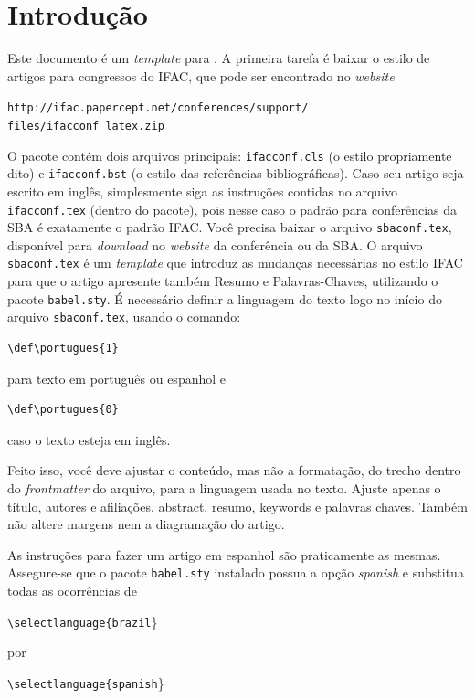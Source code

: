 \section{Introdução}


Este documento é um {\em template} para \LaTeXe. A primeira tarefa é baixar o estilo de artigos para congressos do IFAC, que pode ser encontrado no {\em website}

{\tt http://ifac.papercept.net/conferences/support/}\\
{\tt	files/ifacconf\_latex.zip}


O pacote contém dois arquivos principais: \texttt{ifacconf.cls} (o estilo propriamente dito) e \texttt{ifacconf.bst} (o estilo das referências bibliográficas). Caso seu artigo seja escrito em inglês, simplesmente siga as instruções contidas no arquivo \texttt{ifacconf.tex} (dentro do pacote), pois nesse caso o padrão para conferências da SBA é exatamente o padrão IFAC. 
Você precisa baixar o arquivo \texttt{sbaconf.tex}, disponível para {\em download} no {\em website} da conferência ou da SBA. O arquivo \texttt{sbaconf.tex} é um {\em template} que introduz as mudanças necessárias no estilo IFAC para que o artigo apresente também Resumo e Palavras-Chaves, utilizando o pacote \texttt{babel.sty}. É necessário definir a linguagem do texto logo no início do arquivo \texttt{sbaconf.tex}, usando o comando:

\begin{verbatim}
\def\portugues{1}  
\end{verbatim}
para texto em português ou espanhol e 

\begin{verbatim}
\def\portugues{0}  
\end{verbatim}
caso o texto esteja em inglês.


Feito isso, você deve ajustar o conteúdo, mas não a formatação, do trecho dentro do {\em frontmatter} do arquivo, para 
a linguagem usada no texto. Ajuste apenas o título, autores e afiliações, abstract, resumo, keywords e palavras chaves. Também não altere  margens nem a diagramação do artigo.

As instruções para fazer um artigo em espanhol são praticamente as mesmas. Assegure-se que o pacote \texttt{babel.sty} instalado possua a opção {\em spanish} e substitua todas as ocorrências de

{\tt \textbackslash selectlanguage\{brazil}\}

por 

{\tt \textbackslash selectlanguage\{spanish}\}

